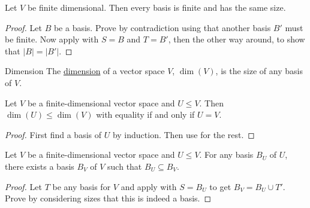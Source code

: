 \documentclass[../Main.tex]{subfiles}
\begin{document}
\begin{corollary}
    Let $V$ be finite dimensional. Then every basis is finite and has the same size.
    \label{corBasisSameSize}
\end{corollary}
\begin{proof}
    Let $B$ be a basis. Prove by contradiction using  that another basis $B'$ must be finite. Now apply  with $S = B$ and $T = B'$, then the other way around, to show that $|B| = |B'|$.
\end{proof}
\begin{definition}{Dimension}
    The \underline{dimension} of a vector space $V$, $\dim(V)$, is the size of any basis of $V$.
\end{definition}
\begin{corollary}
    Let $V$ be a finite-dimensional vector space and $U \leq V$. Then $\dim(U)\leq\dim(V)$ with equality if and only if $U = V$.
    \label{corSubspaceDim}
\end{corollary}
\begin{proof}
    First find a basis of $U$ by induction. Then use  for the rest.
\end{proof}
\begin{proposition}
    Let $V$ be a finite-dimensional vector space and $U \leq V$. For any basis $B_U$ of $U$, there exists a basis $B_V$ of $V$ such that $B_U \subseteq B_V$.
    \label{propBasisExtend}
\end{proposition}
\begin{proof}
    Let $T$ be any basis for $V$ and apply  with $S = B_U$ to get $B_V = B_U \cup T'$. Prove by considering sizes that this is indeed a basis.
\end{proof}
\end{document}
